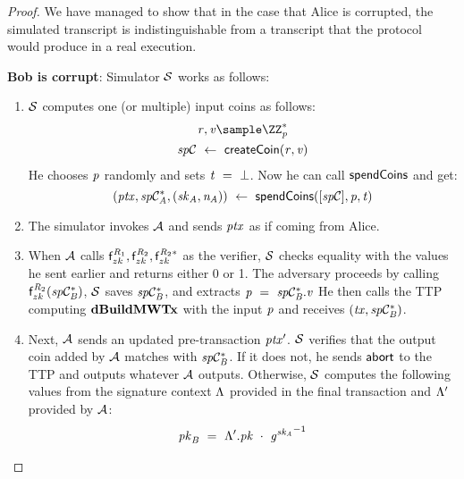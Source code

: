 \begin{proof}
    We have managed to show that in the case that Alice is corrupted, the simulated transcript is indistinguishable from a transcript that the protocol would produce in a real execution.

    \textbf{Bob is corrupt}: Simulator $\mathcal{S}$ works as follows:
    \begin{enumerate}
        \item $\mathcal{S}$ computes one (or multiple) input coins as follows:
        \begin{gather*}
            \varBlindingFactor, \varValue \sample \cnstIntegersPrimeWithoutZero{\varPrime} \\
            \varSpendableCoin \opFunResult \procCreateCoin{\varBlindingFactor}{\varValue}
        \end{gather*}
        He chooses $\mathit{p}$ randomly and sets $\mathit{t} ~=~ \bot$.
        Now he can call $\mathsf{spendCoins}$ and get:
        \[ (\mathit{ptx}, \mathit{sp}\mathcal{C}_{\mathit{A}}^*, (\mathit{sk}_{\mathit{A}}, \mathit{\mathit{n}_{\mathit{A}}})) ~\leftarrow~ \mathsf{spendCoins}([\mathit{sp}\mathcal{C}],\mathit{p},\mathit{t}) \]
        \item The simulator invokes $\mathcal{A}$ and sends $\mathit{ptx}$ as if coming from Alice.
        \item When $\mathcal{A}$ calls $\mathsf{f}^{\mathit{R}_1}_{zk},\mathsf{f}^{\mathit{R}_2}_{zk},\mathsf{f}^{\mathit{R}_2*}_{zk}$ as the verifier, $\mathcal{S}$ checks equality with the values he sent earlier and returns either 0 or 1.
        The adversary proceeds by calling $\mathsf{f}^{\mathit{R}_2}_{zk}(\mathit{sp}\mathcal{C}_{\mathit{B}}^*)$, $\mathcal{S}$ saves $\mathit{sp}\mathcal{C}_{\mathit{B}}^*$, and extracts $\mathit{p} ~=~ \mathit{sp}\mathcal{C}_{\mathit{B}}^*.\mathit{v}$
        He then calls the TTP computing $\mathbf{dBuildMWTx}$ with the input $\mathit{p}$ and receives $(\mathit{tx}, \mathit{sp}\mathcal{C}_{\mathit{B}}^*)$.
        \item Next, $\mathcal{A}$ sends an updated pre-transaction ${\mathit{ptx}}'$.
        $\mathcal{S}$ verifies that the output coin added by $\mathcal{A}$ matches with $\mathit{sp}\mathcal{C}_{\mathit{B}}^*$.
        If it does not, he sends $\mathsf{abort}$ to the TTP and outputs whatever $\mathcal{A}$ outputs.
        Otherwise, $\mathcal{S}$ computes the following values from the signature context $\Lambda$ provided in the final transaction and ${\Lambda}'$ provided by $\mathcal{A}$:
        \begin{gather*}
            \varPubKeyBob \opEqNoQ \funStarAlt{\varSigContext}.\varPubKey \opAddPoint {\funGen{\varSecKeyAlice}}^{-1} \\

\end{gather*}
\end{enumerate}
\end{proof}
